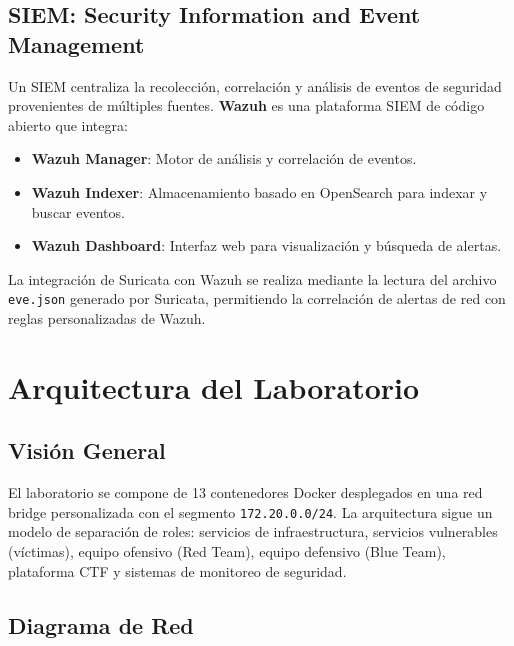 \documentclass[12pt, a4paper]{article}
\begin{document}
\subsection{SIEM: Security Information and Event Management}

Un SIEM centraliza la recolecci\'on, correlaci\'on y an\'alisis de eventos de seguridad provenientes de m\'ultiples fuentes. \textbf{Wazuh} es una plataforma SIEM de c\'odigo abierto que integra:

\begin{itemize}[leftmargin=2cm]
    \item \textbf{Wazuh Manager}: Motor de an\'alisis y correlaci\'on de eventos.
    \item \textbf{Wazuh Indexer}: Almacenamiento basado en OpenSearch para indexar y buscar eventos.
    \item \textbf{Wazuh Dashboard}: Interfaz web para visualizaci\'on y b\'usqueda de alertas.
\end{itemize}

La integraci\'on de Suricata con Wazuh se realiza mediante la lectura del archivo \texttt{eve.json} generado por Suricata, permitiendo la correlaci\'on de alertas de red con reglas personalizadas de Wazuh.

\newpage

\section{Arquitectura del Laboratorio}

\subsection{Visi\'on General}

El laboratorio se compone de 13 contenedores Docker desplegados en una red bridge personalizada con el segmento \texttt{172.20.0.0/24}. La arquitectura sigue un modelo de separaci\'on de roles: servicios de infraestructura, servicios vulnerables (v\'ictimas), equipo ofensivo (Red Team), equipo defensivo (Blue Team), plataforma CTF y sistemas de monitoreo de seguridad.

\subsection{Diagrama de Red}
\end{document}
